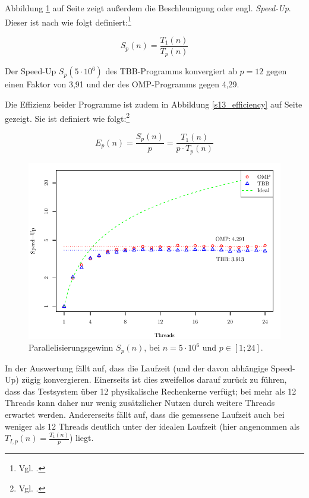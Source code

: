 \documentclass[11pt]{scrartcl}
\begin{document}
Abbildung \ref{s13_speedup} auf Seite \pageref{s13_speedup} zeigt außerdem die Beschleunigung oder engl. \emph{Speed-Up}. Dieser ist nach  wie folgt definiert:\footnote{Vgl. \cite[S.~162]{rauber_parallel_2010}.}

\begin{equation}
S_p(n) = \frac{T_1(n)}{T_p(n)}
\end{equation}

Der Speed-Up $S_p(5\cdot 10^6)$ des TBB-Programms konvergiert ab $p=12$ gegen einen Faktor von 3,91 und der des OMP-Programms gegen 4,29.

Die Effizienz beider Programme ist zudem in Abbildung \ref{s13_efficiency} auf Seite \pageref{s13_efficiency} gezeigt. Sie ist definiert wie folgt:\footnote{Vgl. \cite[S.~164]{rauber_parallel_2010}.}

\begin{equation}
E_p(n) = \frac{S_p(n)}{p} = \frac{T_1(n)}{p \cdot T_p(n)}
\end{equation}

\begin{figure}[pbt]
\centering
\includegraphics{../messdaten/s13_speedup.pdf}
\caption{Parallelisierungsgewinn $S_p(n)$, bei $n=5\cdot 10^6$ und $p \in [1;24]$.}
\label{s13_speedup}
\end{figure}

In der Auswertung fällt auf, dass die Laufzeit (und der davon abhängige Speed-Up) zügig konvergieren. Einerseits ist dies zweifellos darauf zurück zu führen, dass das Testsystem über 12 physikalische Rechenkerne verfügt; bei mehr als 12 Threads kann daher nur wenig zusätzlicher Nutzen durch weitere Threads erwartet werden. Andererseits fällt auf, dass die gemessene Laufzeit auch bei weniger als 12 Threads deutlich unter der idealen Laufzeit (hier angenommen als $T_{I,p}(n) = \frac{T_1(n)}{p}$) liegt.
\end{document}
